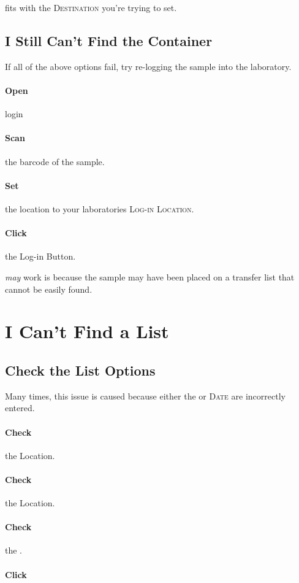   fits with the \textsc{Destination} you're trying to set.

\subsection{I Still Can't Find the Container}

If all of the above options fail, try re-logging the sample into the laboratory.

\paragraph{Open} \gls{login}

\paragraph{Scan} the barcode of the sample.

\paragraph{Set} the location to your laboratories \textsc{Log-in Location}.

\paragraph{Click} the Log-in Button.

 \textit{may} work is because the sample may have been placed on a transfer list that cannot be easily found.


\section{I Can't Find a List}

\subsection{Check the List Options}

Many times, this issue is caused because either the  or \textsc{Date} are incorrectly entered.

\paragraph{Check} the  Location.

\paragraph{Check} the  Location.

\paragraph{Check} the .

\paragraph{Click} \\

